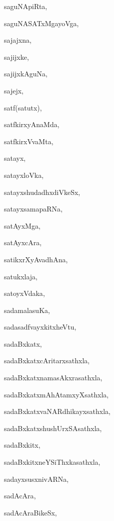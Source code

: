 \begin{multicols}{2}
{saguNApiRta}, \pageref{saguNApiRta}

{saguNASATxMgayoVga}, \pageref{saguNASATxMgayoVga}

{sajajxna}, \pageref{sajajxna}

{sajijxke}, \pageref{sajijxke}

{sajijxkAguNa}, \pageref{sajijxkAguNa}

{sajejx}, \pageref{sajejx}

{satf(satutx)}, \pageref{satfsatutx}

{satfkirxyAnaMda}, \pageref{satfkirxyAnaMda}

{satfkirxVvaMta}, \pageref{satfkirxVvaMta}

{satayx}, \pageref{satayx}

{satayxloVka}, \pageref{satayxloVka}

{satayxshudadhxdiVkeSx}, \pageref{satayxshudadhxdiVkeSx}

{satayxsamapaRNa}, \pageref{satayxsamapaRNa}

{satAyxMga}, \pageref{satAyxMga}

{satAyxcAra}, \pageref{satAyxcAra}

{satikxrXyAvadhAna}, \pageref{satikxrXyAvadhAna}

{satukxlaja}, \pageref{satukxlaja}

{satoyxVdaka}, \pageref{satoyxVdaka}

{sadamalasuKa}, \pageref{sadamalasuKa}

{sadasadfvayxkitxheVtu}, \pageref{sadasadfvayxkitxheVtu}

{sadaBxkatx}, \pageref{sadaBxkatx}

{sadaBxkatxcAritarxsathxla}, \pageref{sadaBxkatxcAritarxsathxla}

{sadaBxkatxnamasAkxrasathxla}, \pageref{sadaBxkatxnamasAkxrasathxla}

{sadaBxkatxmAhAtamxyXsathxla}, \pageref{sadaBxkatxmAhAtamxyXsathxla}

{sadaBxkatxvaNARdhikayxsathxla}, \pageref{sadaBxkatxvaNARdhikayxsathxla}

{sadaBxkatxshushUrxSAsathxla}, \pageref{sadaBxkatxshushUrxSAsathxla}

{sadaBxkitx}, \pageref{sadaBxkitx}

{sadaBxkitxneYSiThxkasathxla}, \pageref{sadaBxkitxneYSiThxkasathxla}

{sadayxsusxnivARNa}, \pageref{sadayxsusxnivARNa}

{sadAcAra}, \pageref{sadAcAra}

{sadAcAraBikeSx}, \pageref{sadAcAraBikeSx}


\end{multicols}

